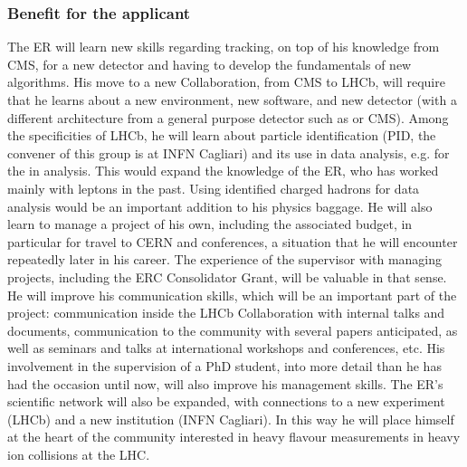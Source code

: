 \documentclass[a4paper,11pt]{article}
\newcommand{\ER}{ER\xspace}
\newcommand{\supervisor}{the supervisor\xspace}
\begin{document}
\subsubsection{Benefit for the applicant}
\label{sec:benefitapplicant}

The \ER will learn new skills regarding tracking, on top of his knowledge from CMS, for a new detector and having to develop the fundamentals of new algorithms. His move to a new Collaboration, from CMS to LHCb, will require that he learns about a new environment, new software, and new detector (with a different architecture from a general purpose detector such as \DO or CMS). 
%
Among the specificities of LHCb, he will learn about particle identification (PID, the convener of this group is at INFN Cagliari) and its use in data analysis, e.g. for the \Dz in \pbpb analysis. 
This would expand the knowledge of the \ER, who has worked mainly with leptons in the past. Using identified charged hadrons for data analysis would be an important addition to his physics baggage.
%
He will also learn to manage a project of his own, including the associated budget, in particular for travel to CERN and conferences, a situation that he will encounter repeatedly later in his career. The experience of \supervisor with managing projects, including the ERC Consolidator Grant, will be valuable in that sense.
%
He will improve his communication skills, which will be an important part of the project: communication inside the LHCb Collaboration with internal talks and documents, communication to the community with several papers anticipated, as well as seminars and talks at international workshops and conferences, etc. His involvement in the supervision of a PhD student, into more detail than he has had the occasion until now, will also improve his management skills.
%
The \ER's scientific network will also be expanded, with connections to a new experiment (LHCb) and a new institution (INFN Cagliari). In this way he will place himself at the heart of the community interested in heavy flavour measurements in heavy ion collisions at the LHC.
\end{document}
